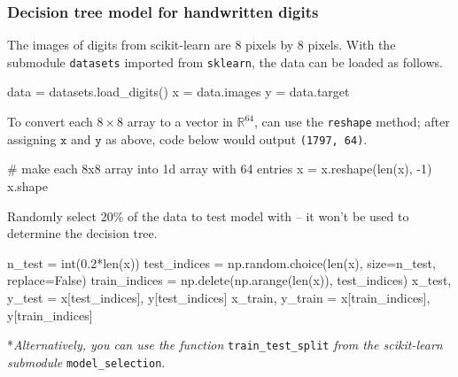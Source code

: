 \documentclass[smaller]{beamer}
\newenvironment{codeblock}
    {\hfill\begin{beamerboxesrounded}[lower=codecol, width=0.8\textwidth]
    \medskip

    }
    { 
    \end{beamerboxesrounded}\hfill
    }
\theoremstyle{example}
\newcommand{\ttt}[1]{{\small\texttt{#1}}}
\begin{document}
\begin{frame}[fragile]
    \frametitle{Decision tree model for handwritten digits}
The images of digits from scikit-learn are $8$ pixels by $8$ pixels. With the submodule \ttt{datasets} imported from \ttt{sklearn}, the data can be loaded as follows.

\begin{codeblock}

\begin{python}
data = datasets.load_digits()
x = data.images
y = data.target
\end{python}

\end{codeblock}

To convert each $8\times 8$ array to a vector in $\mathbb R^{64}$, can use the \ttt{reshape} method; after assigning $\texttt{x}$ and $\texttt{y}$ as above, code below would output \ttt{(1797, 64)}.

\begin{codeblock}

\begin{python}
# make each 8x8 array into 1d array with 64 entries
x = x.reshape(len(x), -1)
x.shape
\end{python}
    
\end{codeblock}

Randomly select 20\% of the data to test model with {--} it won't be used to determine the decision tree.

\begin{codeblock}

\begin{python}
n_test = int(0.2*len(x))
test_indices = np.random.choice(len(x), size=n_test, replace=False)
train_indices = np.delete(np.arange(len(x)), test_indices)
x_test, y_test = x[test_indices], y[test_indices]
x_train, y_train = x[train_indices], y[train_indices]
\end{python}
    
\end{codeblock}
    
*\textit{Alternatively, you can use the function} \lstinline[language=Python,stringstyle=\ttfamily]{train_test_split} \textit{from the scikit-learn submodule} \lstinline[language=Python,stringstyle=\ttfamily]{model_selection}.
\end{frame}
\end{document}
